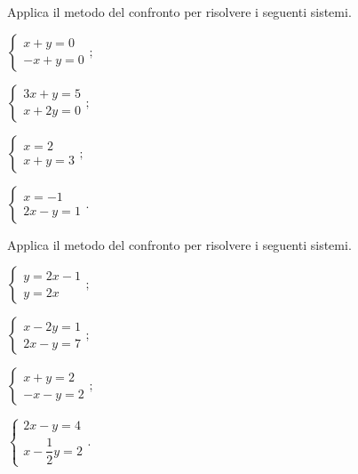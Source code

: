 \begin{esercizio}[\Ast]
 \label{ese:21.16}
Applica il metodo del confronto per risolvere i seguenti sistemi.
 \begin{multicols}{2}
 \begin{enumeratea}
 \item $\left\{\begin{array}{l}x+y=0\\-x+y=0\end{array}\right.;$
\item $\left\{\begin{array}{l}3x+y=5\\x+2y=0\end{array}\right.;$
\item $\left\{\begin{array}{l}x=2\\x+y=3\end{array}\right.;$
\item $\left\{\begin{array}{l}x=-1\\2x-y=1\end{array}\right..$
 \end{enumeratea}
 \end{multicols}
\end{esercizio}

\begin{esercizio}[\Ast]
 \label{ese:21.17}
Applica il metodo del confronto per risolvere i seguenti sistemi.
 \begin{multicols}{2}
 \begin{enumeratea}
 \item $\left\{\begin{array}{l}y=2x-1\\y=2x\end{array}\right.;$
\item $\left\{\begin{array}{l}x-2y=1\\2x-y=7\end{array}\right.;$
\item $\left\{\begin{array}{l}x+y=2\\-x-y=2\end{array}\right.;$
\item $\left\{\begin{array}{l}2x-y=4\\x-\dfrac{1}{2}y=2\end{array}\right..$
 \end{enumeratea}
 \end{multicols}
\end{esercizio}

